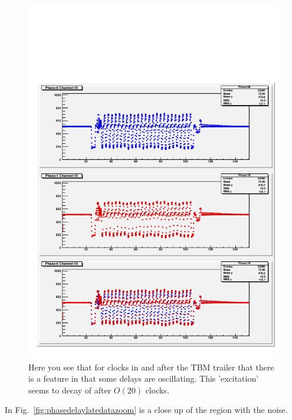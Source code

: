 \begin{figure}
\begin{center}
\includegraphics[width=\linewidth]{phaseAndDelayPlot_channe_10_1_latedata}
\end{center}
\caption{Here you see that for clocks in and after the TBM trailer that there is a feature in that some delays are oscillating. This 'excitation' seems to decay of after $O(20)$ clocks. }
\label{fig:phasedelaylatedata}
\end{figure}

In Fig.~\ref{fig:phasedelaylatedatazoom} is a close up of the region with the noise.

